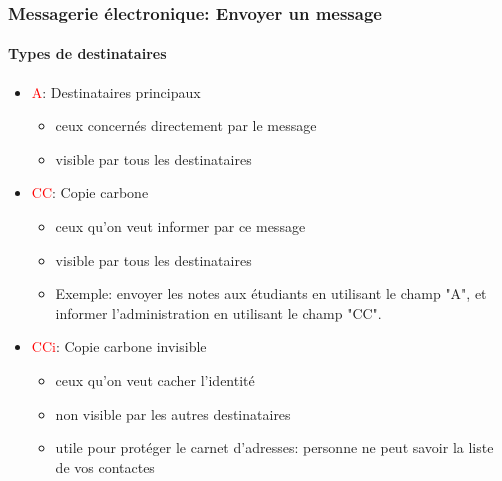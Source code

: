 \documentclass{beamer}
\begin{document}
\begin{frame}
\frametitle{Messagerie électronique: Envoyer un message}
\framesubtitle{Types de destinataires}

\begin{itemize}
	\item \textcolor{red}{A}: Destinataires principaux
	\begin{itemize}
		\item ceux concernés directement par le message 
		\item visible par tous les destinataires
	\end{itemize}

	\item \textcolor{red}{CC}: Copie carbone
	\begin{itemize}
		\item ceux qu'on veut informer par ce message 
		\item visible par tous les destinataires
		\item Exemple: envoyer les notes aux étudiants en utilisant le champ "A", et informer l'administration en utilisant le champ "CC".
	\end{itemize}

	\item \textcolor{red}{CCi}: Copie carbone invisible
	\begin{itemize}
		\item ceux qu'on veut cacher l'identité 
		\item non visible par les autres destinataires
		\item utile pour protéger le carnet d'adresses: personne ne peut savoir la liste de vos contactes
	\end{itemize}

\end{itemize}


\end{frame}
\end{document}
